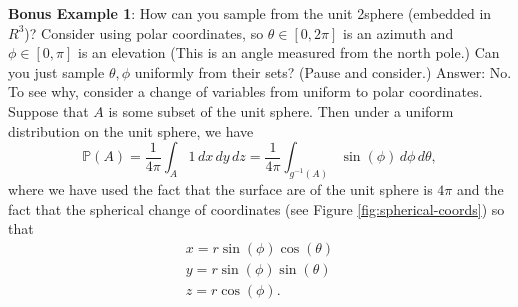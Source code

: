 \documentclass{book}
\newcommand{\dx}{\, dx}
\newcommand{\dy}{\, dy}
\newcommand{\dz}{\, dz}
\renewcommand{\P}{\mathbb{P}}
\begin{document}
\vspace{1em}
\noindent
\textbf{Bonus Example 1}: How can you sample from the unit 2sphere (embedded in $R^3$)? Consider using polar coordinates, so $\theta\in [0, 2\pi]$ is an azimuth and $\phi\in [0, \pi]$ is an elevation (This is an angle measured from the north pole.) Can you just sample $\theta, \phi$ uniformly from their sets? (Pause and consider.) Answer: No. To see why, consider a change of variables from uniform to polar coordinates. Suppose that $A$ is some subset of the unit sphere. Then under a uniform distribution on the unit sphere, we have
$$
\P(A) = \frac{1}{4\pi}\int_{A} 1\dx\dy\dz = \frac{1}{4\pi}\int_{g^{-1}(A)} \sin(\phi) \,d\phi \,d\theta,
$$
where we have used the fact that the surface are of the unit sphere is $4\pi$ and the fact that the spherical change of coordinates (see Figure \ref{fig:spherical-coords}) so that
\begin{align}
x = r\sin(\phi)\cos(\theta) \\
y = r\sin(\phi)\sin(\theta) \\
z = r\cos(\phi). 
\end{align}
\end{document}
